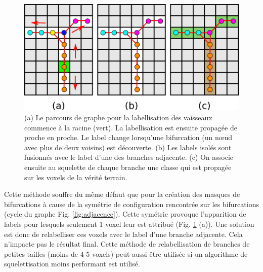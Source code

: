 
\begin{figure}[!ht]
  \centering
  \includegraphics[width=\textwidth]{Images/vessels_size_creation.png}
  \caption{ (a) Le parcours de graphe pour la labellisation des vaisseaux commence à la racine (vert). La labellisation est ensuite propagée de proche en proche. Le label change lorsqu'une bifurcation (un nœud avec plus de deux voisins) est découverte. (b) Les labels isolés sont fusionnés avec le label d'une des branches adjacente. (c) On associe ensuite au squelette de chaque branche une classe qui est propagée sur les voxels de la vérité terrain.}
  \label{fig:graph_traversal}
\end{figure}


Cette méthode souffre du même défaut que pour la création des masques de bifurcations à cause de la symétrie de configuration rencontrée sur les bifurcations (cycle du graphe Fig. \ref{fig:adjacence}). Cette symétrie provoque l'apparition de labels pour lesquels seulement 1 voxel leur est attribué (Fig. \ref{fig:graph_traversal} (a)). Une solution est donc de relabelliser ces voxels avec le label d'une branche adjacente. Cela n'impacte pas le résultat final. Cette méthode de relabellisation de branches de petites tailles (moins de 4-5 voxels) peut aussi être utilisée si un algorithme de squelettisation moins performant est utilisé.

